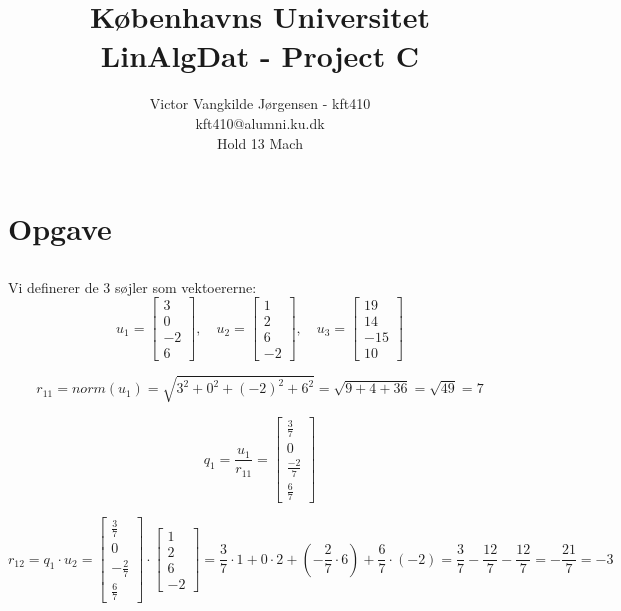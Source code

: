\documentclass[a4paper,12pt]{article}
\title{Københavns Universitet\\
LinAlgDat - Project C}
\author{Victor Vangkilde Jørgensen - kft410\\ 
kft410@alumni.ku.dk\\
Hold 13 Mach}
\begin{document}
 
 
\maketitle 

\section[Opgave]{Opgave}
\subsection{}

Vi definerer de 3 søjler som vektoererne:
\[
u_1 = \left[\begin{array}{c}
    3\\
    0\\
    -2\\
    6
\end{array}\right], \quad
u_2 = \left[\begin{array}{c}
    1\\
    2\\
    6\\
    -2
\end{array}\right], \quad
u_3 = \left[\begin{array}{c}
    19\\
    14\\
    -15\\
    10
\end{array}\right]
\]

\[
r_{11} = norm(u_1) = \sqrt{3^2+0^2+(-2)^2+6^2} = \sqrt{9+4+36} = \sqrt{49} = 7
\]

\[
q_1 = \frac{u_1}{r_{11}} = 
\left[\begin{array}{c}
    \frac{3}{7}\\
    0\\
    \frac{-2}{7}\\
    \frac{6}{7}
\end{array}\right]
\]

\[
r_{12} = q_1 \cdot u_2 = 
\left[\begin{array}{c}
    \frac{3}{7}\\
    0\\
    -\frac{2}{7}\\
    \frac{6}{7}
\end{array}\right]
\cdot
\left[\begin{array}{c}
    1\\
    2\\
    6\\
    -2
\end{array}\right]
=
\frac{3}{7} \cdot 1 + 0 \cdot 2 + (-\frac{2}{7}\cdot 6) + \frac{6}{7} \cdot (-2) = \frac{3}{7} - \frac{12}{7} - \frac{12}{7} = -\frac{21}{7} = -3
\]
\end{document}
